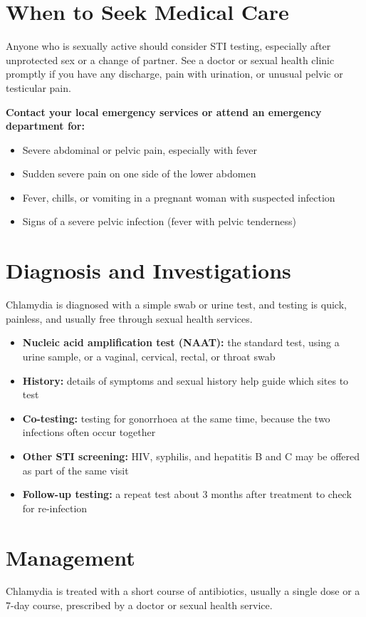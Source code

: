 \section*{When to Seek Medical Care}
Anyone who is sexually active should consider STI testing, especially after unprotected sex or a change of partner. See a doctor or sexual health clinic promptly if you have any discharge, pain with urination, or unusual pelvic or testicular pain.

\textbf{Contact your local emergency services or attend an emergency department for:}
\begin{itemize}
    \item Severe abdominal or pelvic pain, especially with fever
    \item Sudden severe pain on one side of the lower abdomen
    \item Fever, chills, or vomiting in a pregnant woman with suspected infection
    \item Signs of a severe pelvic infection (fever with pelvic tenderness)
\end{itemize}

\section*{Diagnosis and Investigations}
Chlamydia is diagnosed with a simple swab or urine test, and testing is quick, painless, and usually free through sexual health services.

\begin{itemize}
    \item \textbf{Nucleic acid amplification test (NAAT):} the standard test, using a urine sample, or a vaginal, cervical, rectal, or throat swab
    \item \textbf{History:} details of symptoms and sexual history help guide which sites to test
    \item \textbf{Co-testing:} testing for gonorrhoea at the same time, because the two infections often occur together
    \item \textbf{Other STI screening:} HIV, syphilis, and hepatitis B and C may be offered as part of the same visit
    \item \textbf{Follow-up testing:} a repeat test about 3 months after treatment to check for re-infection
\end{itemize}

\section*{Management}
Chlamydia is treated with a short course of antibiotics, usually a single dose or a 7-day course, prescribed by a doctor or sexual health service.

